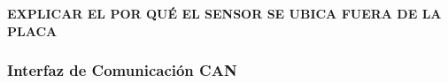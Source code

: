 \textbf{{\color{red} EXPLICAR EL POR QUÉ EL SENSOR SE UBICA FUERA DE LA PLACA}}

\subsubsection{Interfaz de Comunicación CAN}




